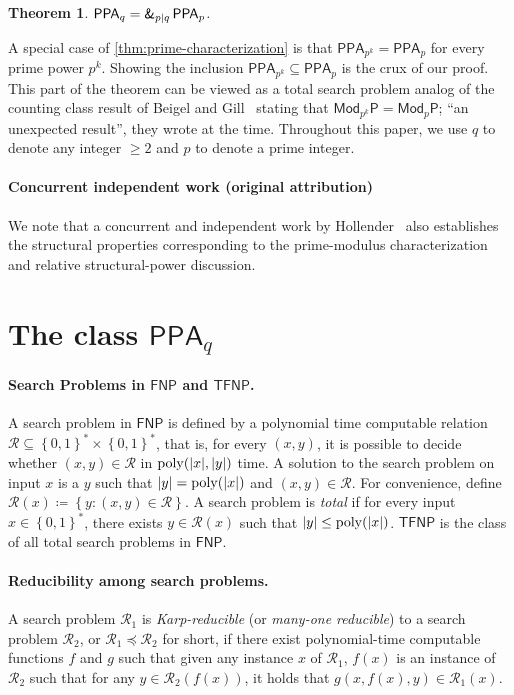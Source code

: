 \documentclass[10pt,a4paper]{article}
\newtheorem{theorem}{Theorem}
\theoremstyle{definition}
\theoremstyle{remark}
\def\set#1{\left\{#1\right\}}
\newcommand{\calR}{\mathcal{R}}
\newcommand{\bit}{\ensuremath{\set{0,1}}}
\DeclareMathOperator*{\poly}{\ensuremath\mathrm{poly}}
\newcommand{\class}[1]{\ensuremath{\mathsf{#1}}\xspace}
\newcommand{\FNP}{\class{FNP}}
\newcommand{\TFNP}{\class{TFNP}}
\newcommand{\PPA}{\class{PPA}}
\renewcommand{\P}{\mathsf P}
\newcommand{\amp}{\textsf{\upshape\&}}
\begin{document}
\begin{theorem}\label{thm:prime-characterization}
$\PPA_q = \amp_{p|q}\, \PPA_p$.
\end{theorem}


\noindent A special case of \autoref{thm:prime-characterization} is that
$\PPA_{p^k}=\PPA_p$ for every prime power $p^k$. Showing the inclusion
$\PPA_{p^k}\subseteq \PPA_p$ is the crux of our proof. This part of the theorem can be viewed as a total search problem
analog of the counting class result of Beigel and Gill~\cite{r7}
stating that $\mathsf{Mod}_{p^k}\P = \mathsf{Mod}_{p}\P$; ``an unexpected
result'', they wrote at the time. Throughout this paper, we use $q$ to denote any integer $\ge 2$ and $p$ to denote a prime integer.

\paragraph{Concurrent independent work (original attribution)}
We note that a concurrent and independent work by Hollender~\cite{r25} also establishes the structural properties corresponding to the prime-modulus characterization and relative structural-power discussion.

\setcounter{section}{1}
\setcounter{theorem}{5}
\section{\boldmath The class $\PPA_q$}
\label{sec:definitions}

\paragraph{\boldmath Search Problems in $\FNP$ and $\TFNP$.} A search problem
in $\FNP$ is defined by a polynomial time computable relation
$\calR\subseteq \bit^* \times \bit^*$, that is, for every $(x,y)$, it is
possible to decide whether $(x,y) \in \calR$ in $\poly(|x|, |y|)$ time. A
solution to the search problem on input $x$ is a $y$ such that
$|y| = \poly(|x|)$ and $(x,y) \in \calR$. For convenience, define
$\calR(x) \coloneqq \set{y : (x,y) \in \calR}$. A search problem is {\em total}
if for every input $x \in \bit^*$, there exists $y \in \calR(x)$ such that $|y|
\le \poly(|x|)$. $\TFNP$ is the class of all total search problems in $\FNP$.

\paragraph{Reducibility among search problems.} A search problem $\calR_1$ is
{\em Karp-reducible} (or {\em many-one reducible}) to a search problem
$\calR_2$, or $\calR_1 \preceq \calR_2$ for short, if there exist polynomial-time computable functions $f$ and $g$ such that given any instance $x$ of $\calR_1$, $f(x)$ is an instance of $\calR_2$ such that for any $y \in \calR_2(f(x))$, it holds that $g(x, f(x), y) \in \calR_1(x)$.
\end{document}
